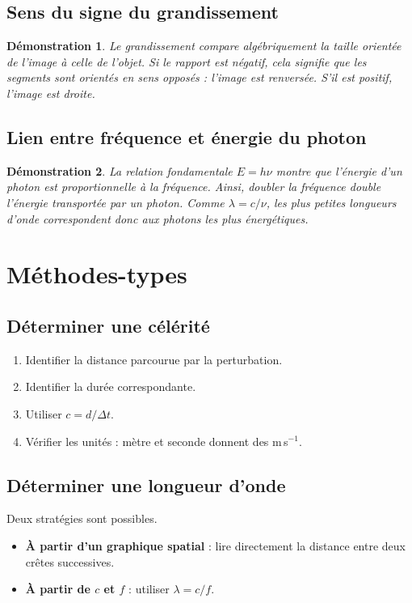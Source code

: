 \documentclass[11pt,a4paper]{article}
\newtheorem*{demonstration}{Démonstration}
\begin{document}
\subsection{Sens du signe du grandissement}
\begin{demonstration}
Le grandissement compare algébriquement la taille orientée de l'image à celle de l'objet. Si le rapport est négatif, cela signifie que les segments sont orientés en sens opposés : l'image est renversée. S'il est positif, l'image est droite.
\end{demonstration}

\subsection{Lien entre fréquence et énergie du photon}
\begin{demonstration}
La relation fondamentale $E=h\nu$ montre que l'énergie d'un photon est proportionnelle à la fréquence. Ainsi, doubler la fréquence double l'énergie transportée par un photon. Comme $\lambda=c/\nu$, les plus petites longueurs d'onde correspondent donc aux photons les plus énergétiques.
\end{demonstration}

\section{Méthodes-types}

\subsection{Déterminer une célérité}
\begin{methode}
\begin{enumerate}
    \item Identifier la distance parcourue par la perturbation.
    \item Identifier la durée correspondante.
    \item Utiliser $c=d/\Delta t$.
    \item Vérifier les unités : mètre et seconde donnent des m\,s$^{-1}$.
\end{enumerate}
\end{methode}

\subsection{Déterminer une longueur d'onde}
\begin{methode}
Deux stratégies sont possibles.
\begin{itemize}
    \item \textbf{À partir d'un graphique spatial} : lire directement la distance entre deux crêtes successives.
    \item \textbf{À partir de $c$ et $f$} : utiliser $\lambda=c/f$.
\end{itemize}
\end{methode}
\end{document}
